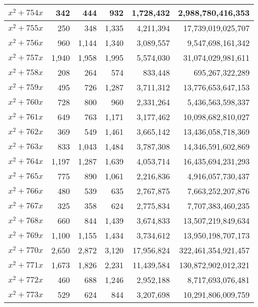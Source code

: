 \documentclass[a4paper]{amsproc}
\theoremstyle{plain}
\theoremstyle{named}
\begin{document}
\begin{longtable}{ | l | r | r | r | r | r | }
$x^2 + 754x$ & 342 & 444 & 932 & 1{,}728{,}432 & 2{,}988{,}780{,}416{,}353 \\ \hline
$x^2 + 755x$ & 250 & 348 & 1{,}335 & 4{,}211{,}394 & 17{,}739{,}019{,}025{,}707 \\ \hline
$x^2 + 756x$ & 960 & 1{,}144 & 1{,}340 & 3{,}089{,}557 & 9{,}547{,}698{,}161{,}342 \\ \hline
$x^2 + 757x$ & 1{,}940 & 1{,}958 & 1{,}995 & 5{,}574{,}030 & 31{,}074{,}029{,}981{,}611 \\ \hline
$x^2 + 758x$ & 208 & 264 & 574 & 833{,}448 & 695{,}267{,}322{,}289 \\ \hline
$x^2 + 759x$ & 495 & 726 & 1{,}287 & 3{,}711{,}312 & 13{,}776{,}653{,}647{,}153 \\ \hline
$x^2 + 760x$ & 728 & 800 & 960 & 2{,}331{,}264 & 5{,}436{,}563{,}598{,}337 \\ \hline
$x^2 + 761x$ & 649 & 763 & 1{,}171 & 3{,}177{,}462 & 10{,}098{,}682{,}810{,}027 \\ \hline
$x^2 + 762x$ & 369 & 549 & 1{,}461 & 3{,}665{,}142 & 13{,}436{,}058{,}718{,}369 \\ \hline
$x^2 + 763x$ & 833 & 1{,}043 & 1{,}484 & 3{,}787{,}308 & 14{,}346{,}591{,}602{,}869 \\ \hline
$x^2 + 764x$ & 1{,}197 & 1{,}287 & 1{,}639 & 4{,}053{,}714 & 16{,}435{,}694{,}231{,}293 \\ \hline
$x^2 + 765x$ & 775 & 890 & 1{,}061 & 2{,}216{,}836 & 4{,}916{,}057{,}730{,}437 \\ \hline
$x^2 + 766x$ & 480 & 539 & 635 & 2{,}767{,}875 & 7{,}663{,}252{,}207{,}876 \\ \hline
$x^2 + 767x$ & 325 & 358 & 624 & 2{,}775{,}834 & 7{,}707{,}383{,}460{,}235 \\ \hline
$x^2 + 768x$ & 660 & 844 & 1{,}439 & 3{,}674{,}833 & 13{,}507{,}219{,}849{,}634 \\ \hline
$x^2 + 769x$ & 1{,}100 & 1{,}155 & 1{,}434 & 3{,}734{,}612 & 13{,}950{,}198{,}707{,}173 \\ \hline
$x^2 + 770x$ & 2{,}650 & 2{,}872 & 3{,}120 & 17{,}956{,}824 & 322{,}461{,}354{,}921{,}457 \\ \hline
$x^2 + 771x$ & 1{,}673 & 1{,}826 & 2{,}231 & 11{,}439{,}584 & 130{,}872{,}902{,}012{,}321 \\ \hline
$x^2 + 772x$ & 460 & 688 & 1{,}246 & 2{,}952{,}188 & 8{,}717{,}693{,}076{,}481 \\ \hline
$x^2 + 773x$ & 529 & 624 & 844 & 3{,}207{,}698 & 10{,}291{,}806{,}009{,}759 \\ \hline

\end{longtable}
\end{document}
